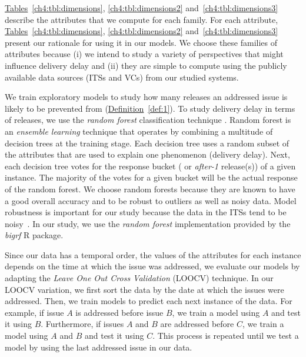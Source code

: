 \hyperref[ch4:tbl:dimensions]{Tables}~\ref{ch4:tbl:dimensions},
\ref{ch4:tbl:dimensions2} and~\ref{ch4:tbl:dimensions3} describe the attributes
that we compute for each family. For each attribute,
\hyperref[ch4:tbl:dimensions]{Tables}~\ref{ch4:tbl:dimensions},
\ref{ch4:tbl:dimensions2} and~\ref{ch4:tbl:dimensions3} present our rationale
for using it in our models. We choose these families of attributes because (i)
we intend to study a variety of perspectives that might influence delivery delay
and (ii) they are simple to compute using the publicly available data sources
(\eg ITSs and VCs) from our studied systems.

We train exploratory models to study how many releases an addressed issue is likely
to be prevented from \DIFdelbegin {}\DIFdelend \DIFaddbegin {}\DIFaddend (\hyperref[def:1]{Definition}~\ref{def:1}). To
study delivery delay in terms of releases, we use the \textit{random forest}
classification technique \cite{RandomForest2001}. Random forest is an {\em
ensemble learning} technique that operates by combining a multitude of decision
trees at the training stage.  Each decision tree uses a random subset of the
attributes that are used to explain one phenomenon (\eg delivery delay). Next,
each decision tree votes for the response bucket ( or {\em after-1}
release(s)) of a given instance. The majority of the votes for a given bucket
will be the actual response of the random forest. We choose random forests
because they are known to have a good overall accuracy and to be robust to
outliers as well as noisy data. Model robustness is important for our study
because the data in the ITSs tend to be noisy~\cite{Herraiz2008}. In our study,
we use the \textit{random forest} implementation provided by the \textit{bigrf}
R package. 

Since our data has a temporal order, \ie the values of the attributes for each
instance depends on the time at which the issue was addressed, we evaluate our
models by adapting the {\em Leave One Out Cross Validation} (LOOCV) technique.
In our LOOCV variation, we first sort the data by the date at which the issues
were addressed. Then, we train models to predict each next instance of the data. For
example, if issue $A$ is addressed before issue $B$, we train a model using $A$ and
test it using $B$. Furthermore, if issues $A$ and $B$ are addressed before $C$, we
train a model using $A$ and $B$ and test it using $C$. This process is repeated
until we test a model by using the last addressed issue in our data.

